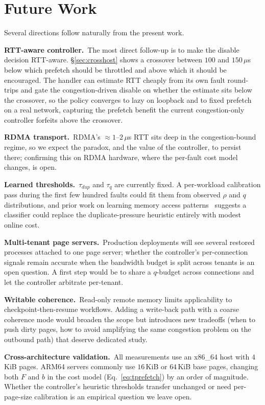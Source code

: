 \documentclass[journal]{IEEEtran}
\newcommand{\dupthr}{\ensuremath{\tau_\textit{dup}}}
\newcommand{\qthr}{\ensuremath{\tau_q}}
\begin{document}
\section{Future Work}
\label{sec:future}

Several directions follow naturally from the present work.

\textbf{RTT-aware controller.}\, The most direct follow-up is to make the
disable decision RTT-aware. \S\ref{sec:crosshost} shows a crossover between
$100$ and $150\,\mu$s below which prefetch should be throttled and above
which it should be encouraged. The handler can estimate RTT cheaply from
its own fault round-trips and gate the congestion-driven disable on whether
the estimate sits below the crossover, so the policy converges to lazy on
loopback and to fixed prefetch on a real network, capturing the prefetch
benefit the current congestion-only controller forfeits above the crossover.

\textbf{RDMA transport.}\, RDMA's $\approx\!1$--$2\,\mu$s RTT sits deep in
the congestion-bound regime, so we expect the paradox, and the value of the
controller, to persist there; confirming this on RDMA hardware, where the
per-fault cost model changes, is open.

\textbf{Learned thresholds.}\, $\dupthr$ and $\qthr$ are currently fixed.
A per-workload calibration pass during the first few hundred faults could
fit them from observed $\rho$ and $q$ distributions, and prior work on
learning memory access patterns~\cite{hashemi2018learning} suggests a
classifier could replace the duplicate-pressure heuristic entirely with
modest online cost.

\textbf{Multi-tenant page servers.}\, Production deployments will see
several restored processes attached to one page server; whether the
controller's per-connection signals remain accurate when the bandwidth
budget is split across tenants is an open question. A first step would be
to share a $q$-budget across connections and let the controller arbitrate
per-tenant.

\textbf{Writable coherence.}\, Read-only remote memory limits applicability
to checkpoint-then-resume workflows. Adding a write-back path with a
coarse coherence mode would broaden the scope but introduces new tradeoffs
(when to push dirty pages, how to avoid amplifying the same congestion
problem on the outbound path) that deserve dedicated study.

\textbf{Cross-architecture validation.}\, All measurements use an x86\_64
host with $4$\,KiB pages. ARM64 servers commonly use $16$\,KiB or
$64$\,KiB base pages, changing both $F$ and $b$ in the cost model
(Eq.~\eqref{eq:tprefetch}) by an order of magnitude. Whether the
controller's heuristic thresholds transfer unchanged or need
per-page-size calibration is an empirical question we leave open.
\end{document}
